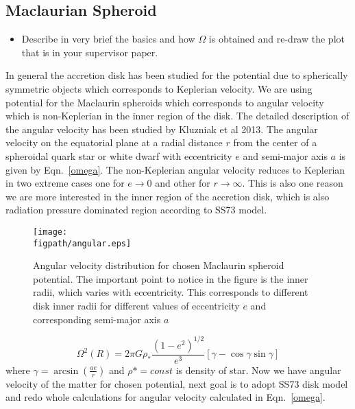 \documentclass[useAMS,usenatbib]{mn2e}
\newcommand{\figpath}{./Figs/}
\begin{document}
\subsection{Maclaurian Spheroid}
\begin{itemize}
\item Describe in very brief the basics and how $\Omega$ is obtained
  and re-draw the plot that is in your supervisor paper. 
\end{itemize}
In general the accretion disk has been studied for the potential due to spherically symmetric objects which corresponds to Keplerian velocity. We are using potential for the Maclaurin spheroids which corresponds to angular velocity which is non-Keplerian in the inner region of the disk. The detailed description of the angular velocity has been studied by Kluzniak et al 2013. The angular velocity on the equatorial plane at a radial distance $r$ from the center of a spheroidal quark star or white dwarf with eccentricity $e$ and semi-major axis $a$ is given by Eqn.~\ref{omega}. The non-Keplerian angular velocity reduces to Keplerian in two extreme cases one for $e\rightarrow 0$ and other for $r\rightarrow \infty$. This is also one reason we are more interested in the inner region of the accretion disk, which is also radiation pressure dominated region according to SS73 model.
\begin{figure}
\centering
\texttt{[image: \\figpath/angular.eps]}
\caption{Angular velocity distribution for chosen Maclaurin spheroid potential. The important point to notice in the figure is the inner radii, which varies with eccentricity. This corresponds to different disk inner radii for different values of eccentricity $e$ and corresponding semi-major axis $a$}
\label{fig:steadyplt1}
\end{figure}
\begin{equation}
\Omega ^2 \left(R\right)= 2\pi G\rho_* \frac{(1-e^2)^{1/2}}{e^3}\left[\gamma - \cos \gamma \sin\gamma \right]
\label{omega}
\end{equation}  
where $\gamma = \arcsin (\frac{a e}{r})$ and $\rho * = const$ is density of star. Now we have angular velocity of the matter for chosen potential, next goal is to adopt SS73 disk model and redo whole calculations for angular velocity calculated in Eqn.~\ref{omega}.
\end{document}
